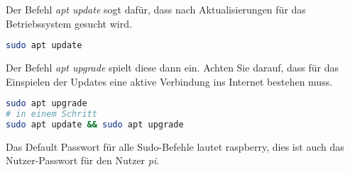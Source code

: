 \documentclass[paper=a4,fontsize=11pt]{scrartcl}%
\numberwithin{equation}{section}
\begin{document}
Der Befehl \emph{apt update} sogt dafür, dass nach Aktualisierungen für das Betriebssystem gesucht wird.
\begin{lstlisting}[style=Bash, language=Bash]
sudo apt update
\end{lstlisting}
Der Befehl \emph{apt upgrade} spielt diese dann ein. Achten Sie darauf, dass für das Einspielen der Updates eine aktive Verbindung ins Internet bestehen muss.
\begin{lstlisting}[style=Bash, language=Bash]
sudo apt upgrade
# in einem Schritt
sudo apt update && sudo apt upgrade
\end{lstlisting}
Das Default Passwort für alle Sudo-Befehle lautet \glqq raspberry\grqq, dies ist auch das Nutzer-Passwort für den Nutzer \emph{pi}.
\end{document}
